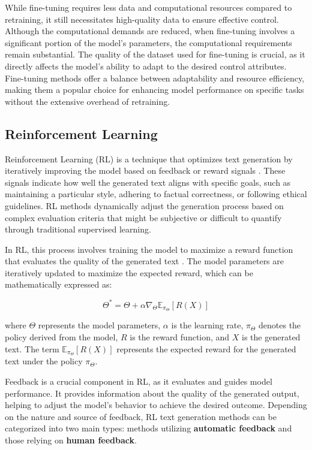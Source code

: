 \documentclass[acmsmall, screen]{acmart}
\begin{document}
While fine-tuning requires less data and computational resources compared to retraining, it still necessitates high-quality data to ensure effective control. Although the computational demands are reduced, when fine-tuning involves a significant portion of the model's parameters, the computational requirements remain substantial. The quality of the dataset used for fine-tuning is crucial, as it directly affects the model's ability to adapt to the desired control attributes. Fine-tuning methods offer a balance between adaptability and resource efficiency, making them a popular choice for enhancing model performance on specific tasks without the extensive overhead of retraining.

\subsection{Reinforcement Learning}
\label{subsec:rl}

Reinforcement Learning (RL) is a technique that optimizes text generation by iteratively improving the model based on feedback or reward signals \cite{ranzato_arxiv16_rlrnn,yu_aaai17_SeqGAN}. These signals indicate how well the generated text aligns with specific goals, such as maintaining a particular style, adhering to factual correctness, or following ethical guidelines. RL methods dynamically adjust the generation process based on complex evaluation criteria that might be subjective or difficult to quantify through traditional supervised learning.

In RL, this process involves training the model to maximize a reward function that evaluates the quality of the generated text \cite{sutton_nips99_rm}. The model parameters are iteratively updated to maximize the expected reward, which can be mathematically expressed as:

\begin{equation}
\Theta^* = \Theta + \alpha \nabla_{\Theta} \mathbb{E}_{\pi_\Theta}[R(X)]
\end{equation}

where \( \Theta \) represents the model parameters, \( \alpha \) is the learning rate, \( \pi_\Theta \) denotes the policy derived from the model, \( R \) is the reward function, and \( X \) is the generated text. The term \( \mathbb{E}_{\pi_\Theta}[R(X)] \) represents the expected reward for the generated text under the policy \( \pi_\Theta \).

Feedback is a crucial component in RL, as it evaluates and guides model performance. It provides information about the quality of the generated output, helping to adjust the model's behavior to achieve the desired outcome. Depending on the nature and source of feedback, RL text generation methods can be categorized into two main types: methods utilizing \textbf{automatic feedback} and those relying on \textbf{human feedback}.
\end{document}
